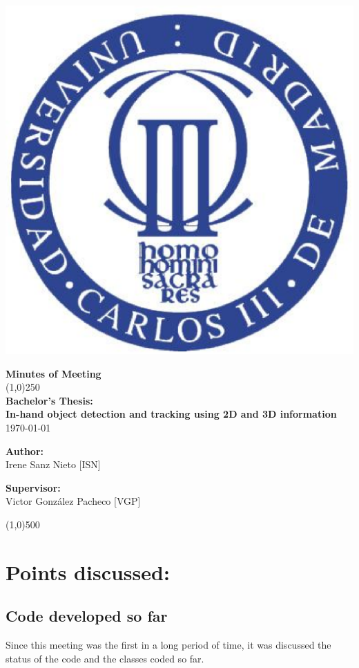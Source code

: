 \documentclass{article}
\newenvironment{myindentpar}[1]%
 {\begin{list}{}%
         {\setlength{\leftmargin}{#1}}%
         \item[]%
 }
 {\end{list}}
\begin{document}
\includegraphics[width=0.1\linewidth]{../template/uc3m.eps}

\vspace{-1cm}
\begin{minipage}[b]{1\linewidth}
	\begin{center}
	{\Huge \bfseries{Minutes of Meeting}}\\
	\line(1,0){250}\\[0.5cm]
	{\LARGE \textbf{Bachelor's Thesis:\\[0.5cm] In-hand object detection and tracking using 2D and 3D information}}\\[0.5cm]
	{\large \today}
	\end{center}
\end {minipage}



\begin{minipage}{0.55\textwidth}
\begin{flushleft} \large
\textbf{{Author:}\\}
Irene Sanz Nieto [ISN]\\
\end{flushleft}
\end{minipage}
\begin{minipage}{0.4\textwidth}
\begin{flushright} \large
\textbf{Supervisor: }\\
Victor González Pacheco [VGP]
\end{flushright}\end{minipage}

\begin{center}
\line(1,0){500}
\end{center}

\renewcommand{\thesubsection}
{\hspace*{1cm} \arabic{section}.\arabic{subsection}}



\section{\LARGE Points discussed: }

  \subsection{Code developed so far}
		\begin{myindentpar}{1cm} 
    Since this meeting was the first in a long period of time, it was discussed the status of the code and the classes coded so far. 
    
		\end{myindentpar}
\end{document}
